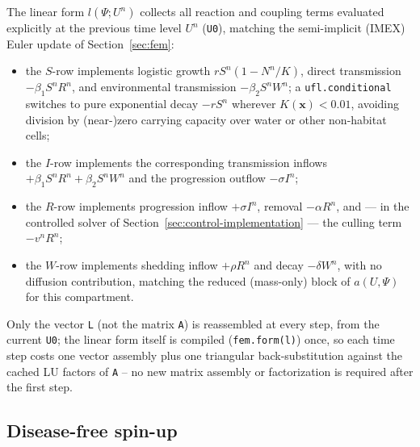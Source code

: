 \documentclass[11pt]{article}
\begin{document}
The linear form $l(\Psi;U^n)$ collects all reaction and coupling terms evaluated explicitly at the previous time level $U^n$ (\texttt{U0}), matching the semi-implicit (IMEX) Euler update of Section~\ref{sec:fem}:
\begin{itemize}
\item the $S$-row implements logistic growth $r S^n(1-N^n/K)$, direct transmission $-\beta_1 S^n R^n$, and environmental transmission $-\beta_2 S^n W^n$; a \texttt{ufl.conditional} switches to pure exponential decay $-rS^n$ wherever $K(\mathbf{x})<0.01$, avoiding division by (near-)zero carrying capacity over water or other non-habitat cells;
\item the $I$-row implements the corresponding transmission inflows $+\beta_1 S^n R^n + \beta_2 S^n W^n$ and the progression outflow $-\sigma I^n$;
\item the $R$-row implements progression inflow $+\sigma I^n$, removal $-\alpha R^n$, and --- in the controlled solver of Section~\ref{sec:control-implementation} --- the culling term $-v^n R^n$;
\item the $W$-row implements shedding inflow $+\rho R^n$ and decay $-\delta W^n$, with no diffusion contribution, matching the reduced (mass-only) block of $a(U,\Psi)$ for this compartment.
\end{itemize}
Only the vector \texttt{L} (not the matrix \texttt{A}) is reassembled at every step, from the current \texttt{U0}; the linear form itself is compiled (\texttt{fem.form(l)}) once, so each time step costs one vector assembly plus one triangular back-substitution against the cached LU factors of \texttt{A} -- no new matrix assembly or factorization is required after the first step.

\subsection{Disease-free spin-up}
\label{sec:spinup}
\end{document}
